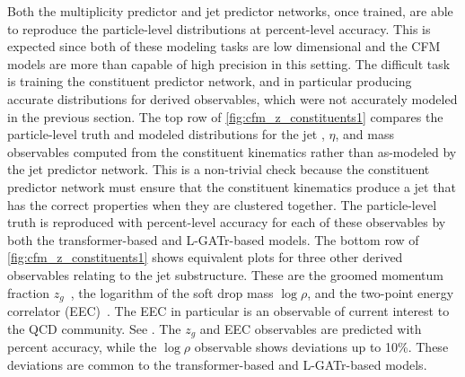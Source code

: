 Both the multiplicity predictor and jet predictor networks, once trained, are able to reproduce the particle-level distributions at percent-level accuracy.
This is expected since both of these modeling tasks are low dimensional and the CFM models are more than capable of high precision in this setting.
The difficult task is training the constituent predictor network, and in particular producing accurate distributions for derived observables, which were not accurately modeled in the previous section.
The top row of \cref{fig:cfm_z_constituents1} compares the particle-level truth and modeled distributions for the jet \pt, $\eta$, and mass observables computed from the constituent kinematics rather than as-modeled by the jet predictor network.
This is a non-trivial check because the constituent predictor network must ensure that the constituent kinematics produce a jet that has the correct properties when they are clustered together.
The particle-level truth is reproduced with percent-level accuracy for each of these observables by both the transformer-based and L-GATr-based models.
The bottom row of \cref{fig:cfm_z_constituents1} shows equivalent plots for three other derived observables relating to the jet substructure.
These are the groomed momentum fraction $z_g$~\cite{Larkoski:2014wba}, the logarithm of the soft drop mass $\log\rho$, and the two-point energy correlator (EEC)~\cite{Moult:2025nhu}.
The EEC in particular is an observable of current interest to the QCD community.
See .
The $z_g$ and EEC observables are predicted with percent accuracy, while the $\log\rho$ observable shows deviations up to 10\%.
These deviations are common to the transformer-based and L-GATr-based models.

